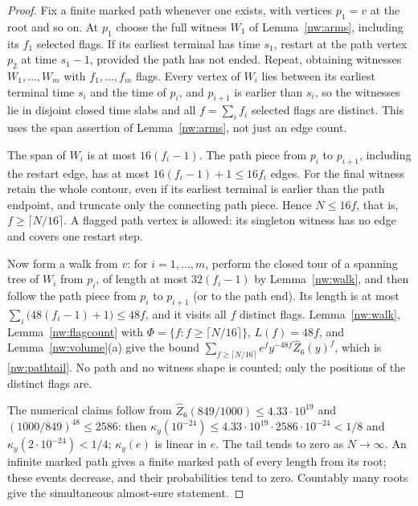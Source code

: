 \begin{proof}
Fix a finite marked path whenever one exists, with vertices $p_1=v$ at the root and so on. At $p_1$
choose the full witness $W_1$ of Lemma~\ref{nw:arms}, including its $f_1$ selected flags. If its
earliest terminal has time $s_1$, restart at the path vertex $p_2$ at time $s_1-1$, provided the path
has not ended. Repeat, obtaining witnesses $W_1,\dots,W_m$ with $f_1,\dots,f_m$ flags. Every vertex of
$W_i$ lies between its earliest terminal time $s_i$ and the time of $p_i$, and $p_{i+1}$ is earlier
than $s_i$, so the witnesses lie in disjoint closed time slabs and all $f=\sum_if_i$ selected flags
are distinct. This uses the span assertion of Lemma~\ref{nw:arms}, not just an edge count.

The span of $W_i$ is at most $16(f_i-1)$. The path piece from $p_i$ to $p_{i+1}$, including the
restart edge, has at most $16(f_i-1)+1\le16f_i$ edges. For the final witness retain the whole
contour, even if its earliest terminal is earlier than the path endpoint, and truncate only the
connecting path piece. Hence $N\le16f$, that is, $f\ge\lceil N/16\rceil$. A flagged path vertex is
allowed: its singleton witness has no edge and covers one restart step.

Now form a walk from $v$: for $i=1,\dots,m$, perform the closed tour of a spanning tree of $W_i$
from $p_i$, of length at most $32(f_i-1)$ by Lemma~\ref{nw:walk}, and then follow the path piece
from $p_i$ to $p_{i+1}$ (or to the path end). Its length is at most
$\sum_i\bigl(48(f_i-1)+1\bigr)\le48f$, and it visits all $f$ distinct flags. Lemma~\ref{nw:walk},
Lemma~\ref{nw:flagcount} with $\Phi=\{f:f\ge\lceil N/16\rceil\}$, $L(f)=48f$, and
Lemma~\ref{nw:volume}(a) give the bound
$\sum_{f\ge\lceil N/16\rceil}e^fy^{-48f}\widehat Z_6(y)^f$, which is \eqref{nw:pathtail}. No path and
no witness shape is counted; only the positions of the distinct flags are.

The numerical claims follow from $\widehat Z_6(849/1000)\le4.33\cdot10^{19}$ and
$(1000/849)^{48}\le2586$: then $\kappa_y(10^{-24})\le4.33\cdot10^{19}\cdot2586\cdot10^{-24}<1/8$ and
$\kappa_y(2\cdot10^{-24})<1/4$; $\kappa_y(e)$ is linear in $e$. The tail tends to zero as
$N\to\infty$. An infinite marked path gives a finite marked path of every length from its root;
these events decrease, and their probabilities tend to zero. Countably many roots give the
simultaneous almost-sure statement.
\end{proof}

